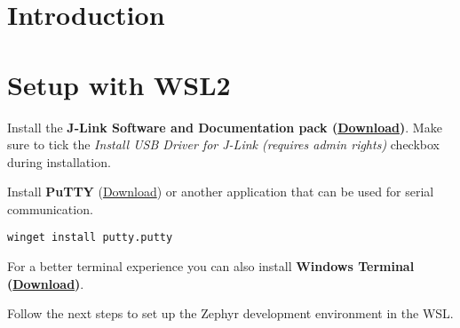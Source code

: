 



\puttitle{}

\section{Introduction}

\newpage

\section{Setup with WSL2}

Install the \textbf{J-Link Software and Documentation pack
  (\href{https://www.segger.com/downloads/jlink/JLink_Windows_x86_64.exe}{Download})}.
Make sure to tick the \emph{Install USB Driver for J-Link (requires admin
  rights)} checkbox during installation.

Install \textbf{PuTTY} (\href{https://putty.org/}{Download}) or another
application that can be used for serial communication.

\begin{lstlisting}
winget install putty.putty
\end{lstlisting}

For a better terminal experience you can also install \textbf{Windows Terminal
  (\href{https://aka.ms/terminal}{Download})}.

Follow the next steps to set up the Zephyr development environment in the WSL.

